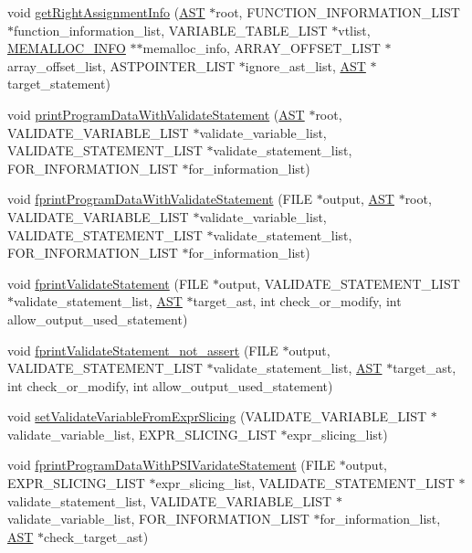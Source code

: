 \begin{DoxyCompactItemize}
\item 
void \hyperlink{Varidate__statement_8h_aa60bcbae8da7bdc52524503b7c715348}{getRightAssignmentInfo} (\hyperlink{structabstract__syntax__tree}{AST} $\ast$root, FUNCTION\_\-INFORMATION\_\-LIST $\ast$function\_\-information\_\-list, VARIABLE\_\-TABLE\_\-LIST $\ast$vtlist, \hyperlink{structmemory__allocation__info}{MEMALLOC\_\-INFO} $\ast$$\ast$memalloc\_\-info, ARRAY\_\-OFFSET\_\-LIST $\ast$array\_\-offset\_\-list, ASTPOINTER\_\-LIST $\ast$ignore\_\-ast\_\-list, \hyperlink{structabstract__syntax__tree}{AST} $\ast$target\_\-statement)
\item 
void \hyperlink{Varidate__statement_8h_ab71973a49693680ddea5a8d1b7aa41d1}{printProgramDataWithValidateStatement} (\hyperlink{structabstract__syntax__tree}{AST} $\ast$root, VALIDATE\_\-VARIABLE\_\-LIST $\ast$validate\_\-variable\_\-list, VALIDATE\_\-STATEMENT\_\-LIST $\ast$validate\_\-statement\_\-list, FOR\_\-INFORMATION\_\-LIST $\ast$for\_\-information\_\-list)
\item 
void \hyperlink{Varidate__statement_8h_a96b7689a221fdc741ce8b54ccb6adef7}{fprintProgramDataWithValidateStatement} (FILE $\ast$output, \hyperlink{structabstract__syntax__tree}{AST} $\ast$root, VALIDATE\_\-VARIABLE\_\-LIST $\ast$validate\_\-variable\_\-list, VALIDATE\_\-STATEMENT\_\-LIST $\ast$validate\_\-statement\_\-list, FOR\_\-INFORMATION\_\-LIST $\ast$for\_\-information\_\-list)
\item 
void \hyperlink{Varidate__statement_8h_a608f035966d41e1f46bbb71141573bf5}{fprintValidateStatement} (FILE $\ast$output, VALIDATE\_\-STATEMENT\_\-LIST $\ast$validate\_\-statement\_\-list, \hyperlink{structabstract__syntax__tree}{AST} $\ast$target\_\-ast, int check\_\-or\_\-modify, int allow\_\-output\_\-used\_\-statement)
\item 
void \hyperlink{Varidate__statement_8h_aaa230f70405d7e663f9b8b24ec0500f2}{fprintValidateStatement\_\-not\_\-assert} (FILE $\ast$output, VALIDATE\_\-STATEMENT\_\-LIST $\ast$validate\_\-statement\_\-list, \hyperlink{structabstract__syntax__tree}{AST} $\ast$target\_\-ast, int check\_\-or\_\-modify, int allow\_\-output\_\-used\_\-statement)
\item 
void \hyperlink{Varidate__statement_8h_adb83c5deab92ed6631e559bac2e476b4}{setValidateVariableFromExprSlicing} (VALIDATE\_\-VARIABLE\_\-LIST $\ast$validate\_\-variable\_\-list, EXPR\_\-SLICING\_\-LIST $\ast$expr\_\-slicing\_\-list)
\item 
void \hyperlink{Varidate__statement_8h_a6b2f1b6c6fcd95240c2329c542335ce9}{fprintProgramDataWithPSIVaridateStatement} (FILE $\ast$output, EXPR\_\-SLICING\_\-LIST $\ast$expr\_\-slicing\_\-list, VALIDATE\_\-STATEMENT\_\-LIST $\ast$validate\_\-statement\_\-list, VALIDATE\_\-VARIABLE\_\-LIST $\ast$validate\_\-variable\_\-list, FOR\_\-INFORMATION\_\-LIST $\ast$for\_\-information\_\-list, \hyperlink{structabstract__syntax__tree}{AST} $\ast$check\_\-target\_\-ast)
$$
\end{DoxyCompactItemize}
